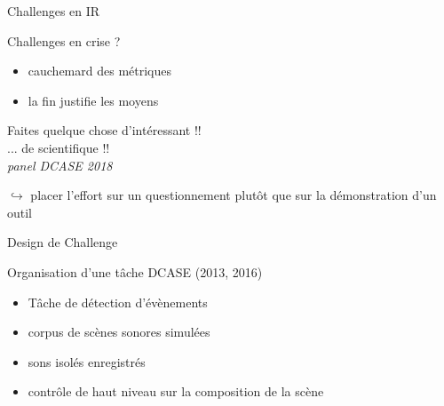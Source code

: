 \begin{frame}{Challenges en IR}
\begin{center}
\end{center}
\vspace{.8cm}
\end{frame}

\begin{frame}{Challenges en crise ?}
\begin{itemize}
    \item cauchemard des métriques
    \item \og la fin justifie les moyens \fg
\end{itemize}
\vspace{.8cm}
\begin{center}
\og Faites quelque chose d'intéressant !! \fg \\
\og ... de scientifique !! \fg \\
\hfill \textit{panel DCASE 2018}
\end{center}
\vspace{.8cm}
$\hookrightarrow{}$ placer l'effort sur un questionnement plutôt que sur la démonstration d'un outil
\end{frame}

\begin{frame}{Design de Challenge}
\begin{block}{Organisation d'une tâche DCASE (2013, 2016)}
\begin{itemize}
\item Tâche de détection d'évènements
\item corpus de scènes sonores simulées
\item sons isolés enregistrés
\item contrôle de haut niveau sur la composition de la scène
\end{itemize}
\end{block} 
\end{frame}

